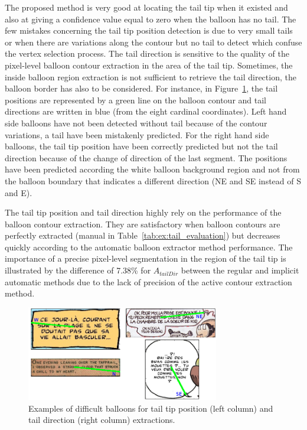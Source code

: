 
The proposed method is very good at locating the tail tip when it existed and also at giving a confidence value equal to zero when the balloon has no tail.
The few mistakes concerning the tail tip position detection is due to very small tails or when there are variations along the contour but no tail to detect which confuse the vertex selection process.
The tail direction is sensitive to the quality of the pixel-level balloon contour extraction in the area of the tail tip.
Sometimes, the inside balloon region extraction is not sufficient to retrieve the tail direction, the balloon border has also to be considered.
For instance, in Figure~\ref{fig:ex:tail_extraction_mistake_errors}, the tail positions are represented by a green line on the balloon contour and tail directions are written in blue (from the eight cardinal coordinates).
Left hand side balloons have not been detected without tail because of the contour variations, a tail have been mistakenly predicted.
For the right hand side balloons, the tail tip position have been correctly predicted but not the tail direction because of the change of direction of the last segment.
The positions have been predicted according the white balloon background region and not from the balloon boundary that indicates a different direction (NE and SE instead of S and E).

The tail tip position and tail direction highly rely on the performance of the balloon contour extraction.
They are satisfactory when balloon contours are perfectly extracted (manual in Table~\ref{tab:ex:tail_evaluation}) but decreases quickly according to the automatic balloon extractor method performance.
The importance of a precise pixel-level segmentation in the region of the tail tip is illustrated by the difference of 7.38\% for $A_{tailDir}$ between the regular and implicit automatic methods due to the lack of precision of the active contour extraction method.


  \begin{figure}[h]  %
    \centering
    \includegraphics[trim= 0px 0px 0px 0px, clip, width=0.75\textwidth]{tail_extraction_errors.png}
    \caption[Examples of difficult balloons for tail tip position and tail direction extractions]{Examples of difficult balloons for tail tip position (left column) and tail direction (right column) extractions.}
    \label{fig:ex:tail_extraction_mistake_errors}
  \end{figure}

